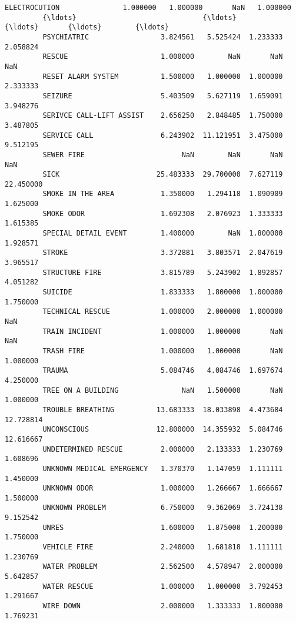 \documentclass[11pt]{article}
\begin{document}
\begin{Verbatim}[commandchars=\\\{\}]
         ELECTROCUTION               1.000000   1.000000       NaN   1.000000   
         {\ldots}                              {\ldots}        {\ldots}       {\ldots}        {\ldots}   
         PSYCHIATRIC                 3.824561   5.525424  1.233333   2.058824   
         RESCUE                      1.000000        NaN       NaN        NaN   
         RESET ALARM SYSTEM          1.500000   1.000000  1.000000   2.333333   
         SEIZURE                     5.403509   5.627119  1.659091   3.948276   
         SERIVCE CALL-LIFT ASSIST    2.656250   2.848485  1.750000   3.487805   
         SERVICE CALL                6.243902  11.121951  3.475000   9.512195   
         SEWER FIRE                       NaN        NaN       NaN        NaN   
         SICK                       25.483333  29.700000  7.627119  22.450000   
         SMOKE IN THE AREA           1.350000   1.294118  1.090909   1.625000   
         SMOKE ODOR                  1.692308   2.076923  1.333333   1.615385   
         SPECIAL DETAIL EVENT        1.400000        NaN  1.800000   1.928571   
         STROKE                      3.372881   3.803571  2.047619   3.965517   
         STRUCTURE FIRE              3.815789   5.243902  1.892857   4.051282   
         SUICIDE                     1.833333   1.800000  1.000000   1.750000   
         TECHNICAL RESCUE            1.000000   2.000000  1.000000        NaN   
         TRAIN INCIDENT              1.000000   1.000000       NaN        NaN   
         TRASH FIRE                  1.000000   1.000000       NaN   1.000000   
         TRAUMA                      5.084746   4.084746  1.697674   4.250000   
         TREE ON A BUILDING               NaN   1.500000       NaN   1.000000   
         TROUBLE BREATHING          13.683333  18.033898  4.473684  12.728814   
         UNCONSCIOUS                12.800000  14.355932  5.084746  12.616667   
         UNDETERMINED RESCUE         2.000000   2.133333  1.230769   1.608696   
         UNKNOWN MEDICAL EMERGENCY   1.370370   1.147059  1.111111   1.450000   
         UNKNOWN ODOR                1.000000   1.266667  1.666667   1.500000   
         UNKNOWN PROBLEM             6.750000   9.362069  3.724138   9.152542   
         UNRES                       1.600000   1.875000  1.200000   1.750000   
         VEHICLE FIRE                2.240000   1.681818  1.111111   1.230769   
         WATER PROBLEM               2.562500   4.578947  2.000000   5.642857   
         WATER RESCUE                1.000000   1.000000  3.792453   1.291667   
         WIRE DOWN                   2.000000   1.333333  1.800000   1.769231   
         

\end{Verbatim}
\end{document}
